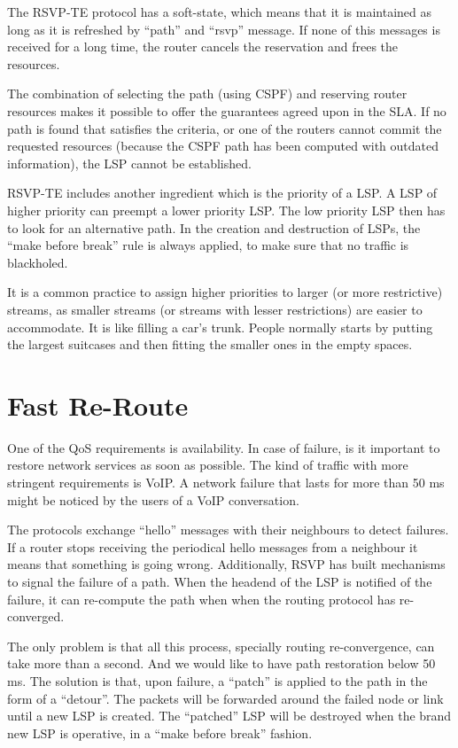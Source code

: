 The RSVP-TE protocol has a soft-state, which means that it is maintained as long as it is refreshed by ``path'' and ``rsvp'' message.
If none of this messages is received for a long time, the router cancels the reservation and frees the resources.

The combination of selecting the path (using CSPF) and reserving router resources makes it possible to offer the guarantees agreed upon in the SLA.
If no path is found that satisfies the criteria, or one of the routers cannot commit the requested resources (because the CSPF path has been computed with outdated information), the LSP cannot be established.

RSVP-TE includes another ingredient which is the priority of a LSP.
A LSP of higher priority can preempt a lower priority LSP.
The low priority LSP then has to look for an alternative path.
In the creation and destruction of LSPs, the ``make before break'' rule is always applied, to make sure that no traffic is blackholed.

It is a common practice to assign higher priorities to larger (or more restrictive) streams, as smaller streams (or streams with lesser restrictions) are easier to accommodate.
It is like filling a car's trunk. 
People normally starts by putting the largest suitcases and then fitting the smaller ones in the empty spaces.

\section{Fast Re-Route}

One of the QoS requirements is availability.
In case of failure, is it important to restore network services as soon as possible.
The kind of traffic with more stringent requirements is VoIP.
A network failure that lasts for more than 50 ms might be noticed by the users of a VoIP conversation.

The protocols exchange ``hello'' messages with their neighbours to detect failures.
If a router stops receiving the periodical hello messages from a neighbour it means that something is going wrong.
Additionally, RSVP has built mechanisms to signal the failure of a path.
When the headend of the LSP is notified of the failure, it can re-compute the path when when the routing protocol has re-converged.

The only problem is that all this process, specially routing re-convergence, can take more than a second.
And we would like to have path restoration below 50 ms.
The solution is that, upon failure, a ``patch'' is applied to the path in the form of a ``detour''.
The packets will be forwarded around the failed node or link until a new LSP is created.
The ``patched'' LSP will be destroyed when the brand new LSP is operative, in a ``make before break'' fashion.

